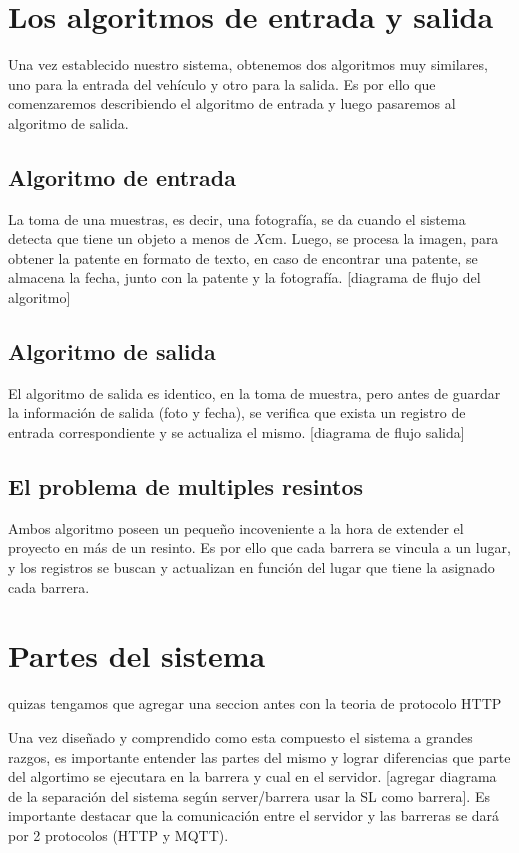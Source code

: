 \section{Los algoritmos de entrada y salida}

Una vez establecido nuestro sistema, obtenemos dos algoritmos muy similares, uno para la entrada del vehículo y otro para la salida. Es por ello que comenzaremos describiendo el algoritmo de entrada y luego pasaremos al algoritmo de salida.

\subsection{Algoritmo de entrada}

La toma de una muestras, es decir, una fotografía, se da cuando el sistema detecta que tiene un objeto a menos de $X$cm. Luego, se procesa la imagen, para obtener la patente en formato de texto, en caso de encontrar una patente, se almacena la fecha, junto con la patente y la fotografía. [diagrama de flujo del algoritmo]

\subsection{Algoritmo de salida}

El algoritmo de salida es identico, en la toma de muestra, pero antes de guardar la información de salida (foto y fecha), se verifica que exista un registro de entrada correspondiente y se actualiza el mismo. [diagrama de flujo salida]

\subsection{El problema de multiples resintos}

Ambos algoritmo poseen un pequeño incoveniente a la hora de extender el proyecto en más de un resinto. Es por ello que cada barrera se vincula a un lugar, y los registros se buscan y actualizan en función del lugar que tiene la asignado cada barrera.
\section{Partes del sistema}

 {\huge quizas tengamos que agregar una seccion antes con la teoria de protocolo HTTP}

Una vez diseñado y comprendido como esta compuesto el sistema a grandes razgos, es importante entender las partes del mismo y lograr diferencias que parte del algortimo se ejecutara en la barrera y cual en el servidor. [agregar diagrama de la separación del sistema según server/barrera usar la SL como barrera]. Es importante destacar que la comunicación entre el servidor y las barreras se dará por 2 protocolos (HTTP y MQTT).

